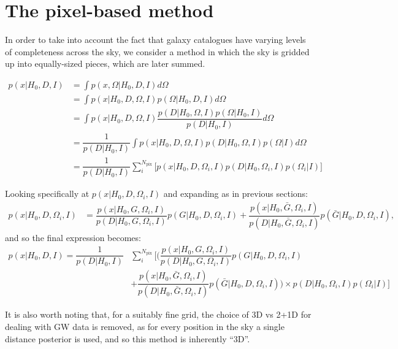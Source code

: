 \documentclass[a4paper,10pt]{article}
\begin{document}
\section{The pixel-based method}
In order to take into account the fact that galaxy catalogues have varying levels of completeness across the sky, we consider a method in which the sky is gridded up into equally-sized pieces, which are later summed.

\begin{equation}
\begin{aligned}
p(x|H_0,D,I) &= \int p(x,\Omega|H_0,D,I) d\Omega
\\ & = \int p(x|H_0,D,\Omega,I) p(\Omega|H_0,D,I) d\Omega
\\ & = \int p(x|H_0,D,\Omega,I) \dfrac{p(D|H_0,\Omega,I)p(\Omega|H_0,I)}{p(D|H_0,I)}  d\Omega
\\ &= \dfrac{1}{p(D|H_0,I)} \int p(x|H_0,D,\Omega,I) p(D|H_0,\Omega,I)p(\Omega|I) d\Omega
\\ &= \dfrac{1}{p(D|H_0,I)} \sum^{N_{\text{pix}}}_i \bigg[p(x|H_0,D,\Omega_i,I) p(D|H_0,\Omega_i,I)p(\Omega_i|I)\bigg]
\end{aligned} 
\end{equation}

Looking specifically at $p(x|H_0,D,\Omega_i,I)$ and expanding as in previous sections:
\begin{equation}
\begin{aligned}
p(x|H_0,D,\Omega_i,I) &= \dfrac{p(x|H_0,G,\Omega_i,I)}{p(D|H_0,G,\Omega_i,I)} p(G|H_0,D,\Omega_i,I) + \dfrac{p(x|H_0,\bar{G},\Omega_i,I)}{p(D|H_0,\bar{G},\Omega_i,I)} p(\bar{G}|H_0,D,\Omega_i,I),
\end{aligned}
\end{equation}
and so the final expression becomes:
\begin{equation}
\begin{aligned}
p(x|H_0,D,I) = \dfrac{1}{p(D|H_0,I)} &\sum^{N_{\text{pix}}}_i \Bigg[ \bigg( \dfrac{p(x|H_0,G,\Omega_i,I)}{p(D|H_0,G,\Omega_i,I)} p(G|H_0,D,\Omega_i,I) \\ &+ \dfrac{p(x|H_0,\bar{G},\Omega_i,I)}{p(D|H_0,\bar{G},\Omega_i,I)} p(\bar{G}|H_0,D,\Omega_i,I) \bigg) \times p(D|H_0,\Omega_i,I)p(\Omega_i|I) \Bigg]
\end{aligned} 
\end{equation}

It is also worth noting that, for a suitably fine grid, the choice of 3D vs 2+1D for dealing with GW data is removed, as for every position in the sky a single distance posterior is used, and so this method is inherently ``3D''.
\end{document}
